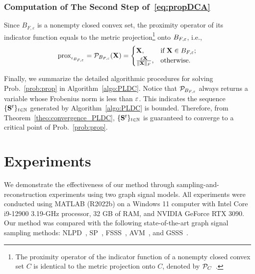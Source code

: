 \documentclass[10pt,journal]{IEEEtran}
\theoremstyle{plain}
\begin{document}
\subsubsection{Computation of The Second Step of~\eqref{eq:propDCA}}
Since $B_{F,\varepsilon}$ is a nonempty closed convex set, the proximity operator of its indicator function equals to the metric projection\footnote{
The proximity operator of the indicator function of a nonempty closed convex set $C$ is identical to the metric projection onto $C$, denoted by $\mathcal{P}_{C}$~\cite{Bauschke2011Convex}.
} onto $B_{F,\varepsilon}$, i.e.,
\begin{equation}
    \label{eq:proj_Fball}
    \mathrm{prox}_{\iota_{B_{F,\varepsilon}}}=\mathcal{P}_{B_{F,\varepsilon}}(\mathbf{X}) 
    = \begin{cases}
        \mathbf{X}, & \mathrm{if} \: \mathbf{X} \in B_{F,\varepsilon}; \\
        \frac{\varepsilon\mathbf{X}}{\| \mathbf{X} \|_{F}}, & \mathrm{otherwise}.
    \end{cases}
\end{equation}


Finally, we summarize the detailed algorithmic procedures for solving Prob.~\eqref{prob:prop} in Algorithm~\ref{algo:PLDC}.
Notice that $\mathcal{P}_{B_{F,\varepsilon}}$ always returns a variable whose Frobenius norm is less than $\varepsilon$.
This indicates the sequence $\{\mathbf{S}^{t}\}_{t \in \mathbb{N}}$ generated by Algorithm~\ref{algo:PLDC} is bounded.
Therefore, from Theorem~\ref{theo:convergence_PLDC}, $\{\mathbf{S}^{t}\}_{t \in \mathbb{N}}$ is guaranteed to converge to a critical point of Prob.~\eqref{prob:prop}.

\section{Experiments}
We demonstrate the effectiveness of our method through sampling-and-reconstruction experiments using two graph signal models.
All experiments were conducted using MATLAB (R2022b) on a Windows 11 computer with Intel Core i9-12900 3.19-GHz processor, 32 GB of RAM, and NVIDIA GeForce RTX 3090.
Our method was compared with the following state-of-the-art graph signal sampling methods: NLPD~\cite{Chen2015Discrete}, SP~\cite{Anis2016Efficient}, FSSS~\cite{Sakiyama2019Eigendecomposition}, AVM~\cite{Jayawant2022Practical}, and GSSS~\cite{Hara2022GSSS}.
\end{document}

